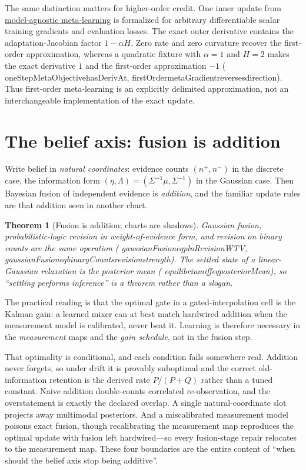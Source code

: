 \documentclass[11pt]{article}
\newtheorem{theorem}{Theorem}[section]
\newcommand{\leanname}[1]{{\scriptsize\ttfamily
  \def\_{\textunderscore\allowbreak}#1}}
\begin{document}
The same distinction matters for higher-order credit.  One inner update from
\href{https://arxiv.org/abs/1703.03400}{model-agnostic meta-learning} is
formalized for arbitrary differentiable scalar training gradients and evaluation losses.
The exact outer derivative contains the adaptation-Jacobian factor
$1-\alpha H$.  Zero rate and zero curvature recover the first-order approximation,
whereas a quadratic fixture with $\alpha=1$ and $H=2$ makes the exact derivative
$1$ and the first-order approximation $-1$
(\leanname{oneStepMetaObjective\_hasDerivAt},
\leanname{firstOrder\_metaGradient\_reverses\_direction}).
Thus first-order meta-learning is an explicitly delimited approximation, not an
interchangeable implementation of the exact update.

\section{The belief axis: fusion is addition}
\label{sec:belief}

Write belief in \emph{natural coordinates}: evidence counts $(n^{+},n^{-})$ in the
discrete case, the information form $(\eta,\Lambda)=(\Sigma^{-1}\mu,\Sigma^{-1})$ in the
Gaussian case. Then Bayesian fusion of independent evidence is \emph{addition}, and the
familiar update rules are that addition seen in another chart.

\begin{theorem}[Fusion is addition; charts are shadows]
Gaussian fusion, probabilistic-logic revision in weight-of-evidence form, and revision on
binary counts are the same operation
(\leanname{gaussianFusion\_eq\_plnRevisionWTV},
\leanname{gaussianFusion\_eq\_binaryCounts\_revision\_strength}). The settled state of a
linear-Gaussian relaxation is the posterior mean
(\leanname{equilibrium\_iff\_eq\_posteriorMean}), so ``settling performs inference'' is a
theorem rather than a slogan.
\end{theorem}

The practical reading is that the optimal gate in a gated-interpolation cell is the Kalman
gain: a learned mixer can at best match hardwired addition when the measurement model is
calibrated, never beat it. Learning is therefore necessary in the \emph{measurement} maps
and the \emph{gain schedule}, not in the fusion step.

That optimality is conditional, and each condition fails somewhere real. Addition never
forgets, so under drift it is provably suboptimal and the correct old-information
retention is the derived rate $P/(P+Q)$ rather than a tuned constant. Naive addition
double-counts correlated re-observation, and the overstatement is exactly the declared
overlap. A single natural-coordinate slot projects away multimodal posteriors. And a
miscalibrated measurement model poisons exact fusion, though recalibrating the measurement
map reproduces the optimal update with fusion left hardwired---so every fusion-stage
repair relocates to the measurement map. These four boundaries are the entire content of
``when should the belief axis stop being additive''.
\end{document}
